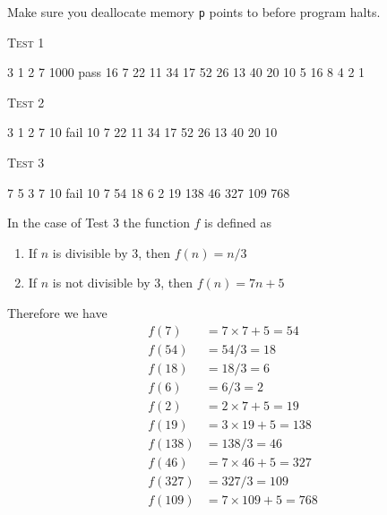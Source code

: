 Make sure you deallocate memory \verb!p! points to before program halts.

\textsc{Test 1}
\begin{console}[frame=single,fontsize=\footnotesize, commandchars=\\\{\}]
3 1 2 7 1000 pass 16 7 22 11 34 17 52 26 13 40 20 10 5 16 8 4 2 1
\end{console}

\textsc{Test 2}
\begin{console}[frame=single,fontsize=\footnotesize, commandchars=\\\{\}]
3 1 2 7 10 fail 10 7 22 11 34 17 52 26 13 40 20 10
\end{console}

\textsc{Test 3}
\begin{console}[frame=single,fontsize=\footnotesize,commandchars=\\\{\}]
7 5 3 7 10 fail 10 7 54 18 6 2 19 138 46 327 109 768
\end{console}

In the case of Test 3 the function $f$ is defined as
\begin{enumerate}
\item If $n$ is divisible by 3, then $f(n) = n/3$
\item If $n$ is not divisible by 3, then $f(n) = 7n + 5$
\end{enumerate}

Therefore we have
\begin{align*}
f(7)   &= 7 \times 7+5 = 54 \\
f(54)  &= 54/3 = 18 \\
f(18)  &= 18/3 = 6 \\
f(6)   &= 6/3 = 2 \\
f(2)   &= 2 \times 7+5 = 19 \\
f(19)  &= 3 \times 19+5 = 138 \\
f(138) &= 138/3 = 46 \\
f(46)  &= 7 \times 46+5 = 327 \\
f(327) &= 327/3 = 109 \\
f(109) &= 7 \times 109+5 = 768 \\
\end{align*}
